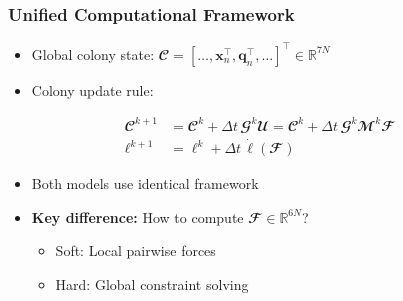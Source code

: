 \documentclass[
	10pt,
	t
]{beamer}
\begin{document}
\begin{frame}
    \frametitle{Unified Computational Framework}

    \begin{itemize}
        \item Global colony state: $\mathbfcal{C} = [\dots, \mathbf{x}_n^\top, \mathbf{q}_n^\top, \dots]^\top \in \mathbb{R}^{7N}$
        \item Colony update rule:
    \end{itemize}

    \begin{equation} \label{eq:colony_update}
        \begin{aligned}
            \mathbfcal{C}^{k+1}     & = \mathbfcal{C}^k + \Delta t \, \mathbfcal{G}^k \mathbfcal{U} = \mathbfcal{C}^k + \Delta t \, \mathbfcal{G}^k \mathbfcal{M}^k \mathbfcal{F} \\
            \boldsymbol{\ell}^{k+1} & = \boldsymbol{\ell}^k + \Delta t \, \dot{\boldsymbol{\ell}}(\mathbfcal{F})
        \end{aligned}
    \end{equation}


    \begin{itemize}
        \item Both models use identical framework
        \item \textbf{Key difference:} How to compute $\mathbfcal{F} \in \mathbb{R}^{6N}$?
              \begin{itemize}
                  \item Soft: Local pairwise forces
                  \item Hard: Global constraint solving
              \end{itemize}
    \end{itemize}

\end{frame}
\end{document}
